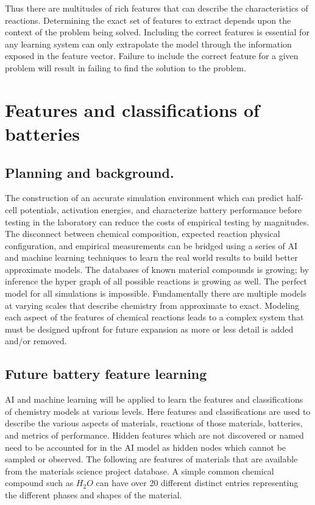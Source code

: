 \documentclass{article}
\begin{document}
Thus there are multitudes of rich features that can describe the characteristics of reactions. Determining the exact set of features to extract depends upon the context of the problem being solved. Including the correct features is essential for any learning system can only extrapolate the model through the information exposed in the feature vector. Failure to include the correct feature for a given problem will result in failing to find the solution to the problem.

\newpage
\section{Features and classifications of batteries}

\subsection{Planning and background.}
The construction of an accurate simulation environment which can predict half-cell potentials, activation energies, and characterize battery performance before testing in the laboratory can reduce the costs of empirical testing by magnitudes. The disconnect between chemical composition, expected reaction physical configuration, and empirical measurements can be bridged using a series of AI and machine learning techniques to learn the real world results to build better approximate models. The databases of known material compounds is growing; by inference the hyper graph of all possible reactions is growing as well.  The perfect model for all simulations is impossible. Fundamentally there are multiple models at varying scales that describe chemistry from approximate to exact. Modeling each aspect of the features of chemical reactions leads to a complex system that must be designed upfront for future expansion as more or less detail is added and/or removed.\\

\subsection{Future battery feature learning}
AI and machine learning will be applied to learn the features and classifications of chemistry models at various levels. Here features and classifications are used to describe the various aspects of materials, reactions of those materials, batteries, and metrics of performance. Hidden features which are not discovered or named need to be accounted for in the AI model as hidden nodes which cannot be sampled or observed. The following are features of materials that are available from the materials science project database. A simple common chemical compound such as $H_2O$ can have over 20 different distinct entries representing the different phases and shapes of the material. \\
\end{document}
